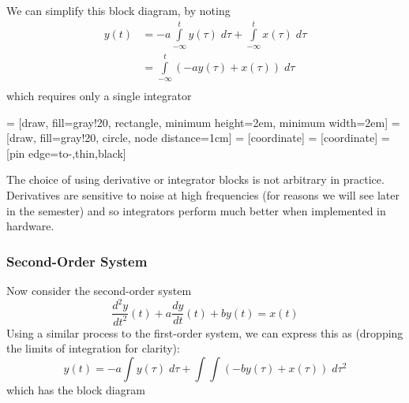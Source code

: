 We can simplify this block diagram, by noting
\begin{align*}
  y(t) &= -a\int\limits_{-\infty}^t y(\tau)\; d\tau + \int\limits_{-\infty}^t
  x(\tau)\; d\tau\\
  &= \int\limits_{-\infty}^t \left(-a y(\tau) +  x(\tau)\right)\; d\tau\\
\end{align*}
which requires only a single integrator
\begin{center}
   = [draw, fill=gray!20, rectangle, 
    minimum height=2em, minimum width=2em]
   = [draw, fill=gray!20, circle, node distance=1cm]
   = [coordinate]
   = [coordinate]
   = [pin edge={to-,thin,black}]
  
\end{center}

The choice of using derivative or integrator blocks is not arbitrary in practice. Derivatives are sensitive to noise at high frequencies (for reasons we will see later in the semester) and so integrators perform much better when implemented in hardware. 

\subsubsection*{Second-Order System}

Now consider the second-order system
\[
\frac{d^2y}{dt^2}(t) + a\frac{dy}{dt}(t)  + by(t)= x(t)
\]
Using a similar process to the first-order system, we can express this as (dropping the limits of integration for clarity):
\[
y(t) = -a \int y(\tau)\; d\tau + \int\int \left( -by(\tau) + x(\tau) \right) \; d\tau^2 
\]
which has the block diagram

